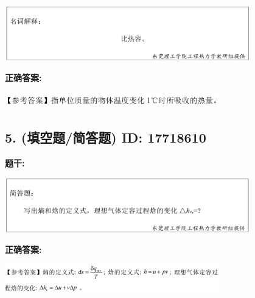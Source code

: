 \documentclass[12pt]{article}
\begin{document}
\begin{center}\includegraphics[width=0.8\textwidth, height=0.25\textheight, keepaspectratio]{question_4_17718612/title_img_1.png}\end{center}

\textbf{正确答案:}

\begin{center}\includegraphics[width=0.7\textwidth, height=0.2\textheight, keepaspectratio]{question_4_17718612/correct_answer_1_img_1.png}\end{center}

\vspace{0.5em}\hrulefill\vspace{1em}

\subsection*{5. (填空题/简答题) \small ID: 17718610}

\textbf{题干:}


\begin{center}\includegraphics[width=0.8\textwidth, height=0.25\textheight, keepaspectratio]{question_5_17718610/title_img_1.png}\end{center}

\textbf{正确答案:}

\begin{center}\includegraphics[width=0.7\textwidth, height=0.2\textheight, keepaspectratio]{question_5_17718610/correct_answer_1_img_1.png}\end{center}

\vspace{0.5em}\hrulefill\vspace{1em}
\end{document}
